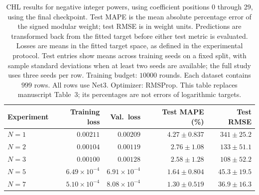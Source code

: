\begin{table}[!htbp]
\centering
\small
\setlength{\tabcolsep}{4pt}
\renewcommand{\arraystretch}{1.18}
\begin{tabular}{@{}lrrrr@{}}
\toprule
Experiment & Training loss & Val.\ loss & Test MAPE (\%) & Test RMSE \\
\midrule
$N=1$ & $0.00211$ & $0.00209$ & $4.27\pm0.837$ & $341\pm25.2$ \\
$N=2$ & $0.00104$ & $0.00119$ & $2.76\pm1.08$ & $133\pm51.1$ \\
$N=3$ & $0.00100$ & $0.00128$ & $2.58\pm1.28$ & $108\pm52.2$ \\
$N=5$ & $6.49\times10^{-4}$ & $6.91\times10^{-4}$ & $1.64\pm0.804$ & $45.3\pm19.5$ \\
$N=7$ & $5.10\times10^{-4}$ & $8.08\times10^{-4}$ & $1.30\pm0.519$ & $36.9\pm16.3$ \\
\bottomrule
\end{tabular}
\caption{\textsf{CHL results for negative integer powers, using coefficient positions 0 through 29, using the final checkpoint. Test MAPE is the mean absolute percentage error of the signed modular weight; test RMSE is in weight units. Predictions are transformed back from the fitted target before either test metric is evaluated. Losses are means in the fitted target space, as defined in the experimental protocol. Test entries show means across training seeds on a fixed split, with sample standard deviations when at least two seeds are available; the full study uses three seeds per row. Training budget: $10000$ rounds. Each dataset contains $999$ rows. All rows use Net3. Optimizer: RMSProp. This table replaces manuscript Table~3; its percentages are not errors of logarithmic targets.}}
\label{tab:chl-revised-3-final}
\end{table}
